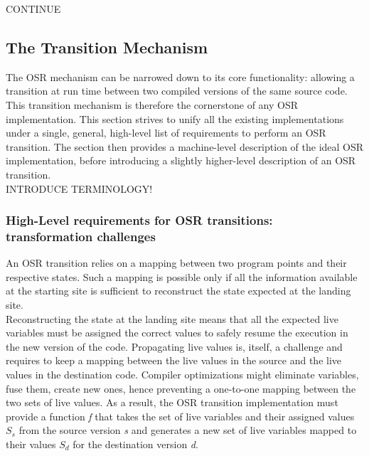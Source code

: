 CONTINUE

\subsection{The Transition Mechanism}
The OSR mechanism can be narrowed down to its core functionality: allowing a transition at run time between two compiled versions of the same source code.
This transition mechanism is therefore the cornerstone of any OSR implementation.
This section strives to unify all the existing implementations under a single, general, high-level list of requirements to perform an OSR transition.
The section then provides a machine-level description of the ideal OSR implementation, before introducing a slightly higher-level description of an OSR transition.\\

INTRODUCE TERMINOLOGY!

\subsubsection{High-Level requirements for OSR transitions: transformation challenges}\label{HLREQ}

An OSR transition relies on a mapping between two program points and their respective states.
Such a mapping is possible only if all the information available at the starting site is sufficient to reconstruct the state expected at the landing site.\\

Reconstructing the state at the landing site means that all the expected live variables must be assigned the correct values to safely resume the execution in the new version of the code.
Propagating live values is, itself, a challenge and requires to keep a mapping between the live values in the source and the live values in the destination code.
Compiler optimizations might eliminate variables, fuse them, create new ones, hence preventing a one-to-one mapping between the two sets of live values. 
As a result, the OSR transition implementation must provide a function \textit{f} that takes the set of live variables and their assigned values $S_s$ from the source version \textit{s} and generates a new set of live variables mapped to their values $S_d$ for the destination version \textit{d}.

